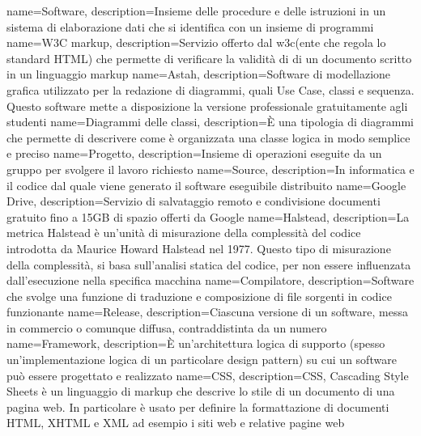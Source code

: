  {
	name=Software,
	description={Insieme delle procedure e delle istruzioni in un sistema di elaborazione dati che si identifica con un insieme di programmi}
}
 {
	name=W3C markup,
	description={Servizio offerto dal w3c(ente che regola lo standard HTML) che permette di verificare la validità di di un documento scritto in un linguaggio markup}
}
 {
	name=Astah,
	description={Software di modellazione grafica utilizzato per la redazione di diagrammi, quali Use Case, classi e sequenza. Questo software mette a disposizione la versione professionale gratuitamente agli studenti}
}
 {
	name=Diagrammi delle classi,
	description={È una tipologia di diagrammi che permette di descrivere come è organizzata una classe logica in modo semplice e preciso}
}
 {
	name=Progetto,
	description={Insieme di operazioni eseguite da un gruppo per svolgere il lavoro richiesto}
}
 {
	name=Source,
	description={In informatica e il codice dal quale viene generato il software eseguibile distribuito}
}
 {
	name=Google Drive,
	description={Servizio di salvataggio remoto e condivisione documenti gratuito fino a 15GB di spazio offerti da Google}
}
 {
	name=Halstead,
	description={La metrica Halstead è un'unità di misurazione della complessità del codice introdotta da Maurice Howard Halstead nel 1977. Questo tipo di misurazione della complessità, si basa sull'analisi statica del codice, per non essere influenzata dall'esecuzione nella specifica macchina}
}
 {
	name=Compilatore,
	description={Software che svolge una funzione di traduzione e composizione di file sorgenti in codice funzionante}
}
 {
	name=Release,
	description={Ciascuna versione di un software, messa in commercio o comunque diffusa, contraddistinta da un numero}
}
 {
	name=Framework,
	description={È un'architettura logica di supporto (spesso un'implementazione logica di un particolare design pattern) su cui un software può essere progettato e realizzato}
}
 {
	name=CSS,
	description={CSS, Cascading Style Sheets è un linguaggio di markup che descrive lo stile di un documento di una pagina web. In particolare è usato per definire la formattazione di documenti HTML, XHTML e XML ad esempio i siti web e relative pagine web}
}
